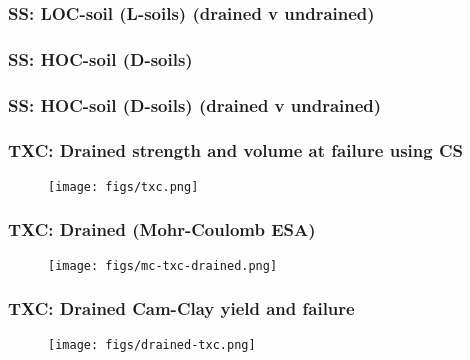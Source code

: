 \documentclass[notes]{beamer}
\begin{document}
\begin{frame}
\frametitle{SS: LOC-soil (L-soils)  (drained v undrained)}
\end{frame}

\begin{frame}
\frametitle{SS: HOC-soil (D-soils)}
\end{frame}

\begin{frame}
\frametitle{SS: HOC-soil (D-soils)  (drained v undrained)}
\end{frame}

\begin{frame}
\frametitle{TXC: Drained strength and volume at failure using CS}
\begin{figure}
	\texttt{[image: figs/txc.png]}
\end{figure}
\end{frame}

\begin{frame}
\frametitle{TXC: Drained (Mohr-Coulomb ESA)}
\begin{figure}
	\texttt{[image: figs/mc-txc-drained.png]}
\end{figure}
\end{frame}

\begin{frame}
\frametitle{TXC: Drained Cam-Clay yield and failure}
\begin{figure}
	\texttt{[image: figs/drained-txc.png]}
\end{figure}
\end{frame}
\end{document}
